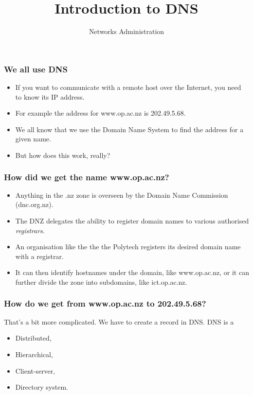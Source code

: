 \documentclass[10pt]{beamer}
\title{Introduction to DNS}
\author[IN715]{Networks Administration}
\institute[Otago Polytechnic]{
  Otago Polytechnic \\
  Dunedin, New Zealand \\
}
\date{}
\begin{document}
\begin{frame}[plain]
  \titlepage
\end{frame}


\begin{frame}
  \frametitle{We all use DNS}

 \begin{itemize}
  \item If you want to communicate with a remote host over the Internet, 
        you need to know its IP address.
  \item For example the address for www.op.ac.nz is 202.49.5.68.
  \item We all know that we use the Domain Name System to find the 
        address for a given name.
  \item But how does this work, really? 
 \end{itemize}

\end{frame}


\begin{frame}
  \frametitle{How did we get the name www.op.ac.nz?}

 \begin{itemize}
  \item Anything in the .nz zone is overseen by the Domain Name Commission (dnc.org.nz).
  \item The DNZ delegates the ability to register domain names to various authorised \emph{registrars}.
  \item An organisation like the the the Polytech registers its desired domain name with a registrar.
  \item It can then identify hostnames under the domain, like www.op.ac.nz, or it can further divide the zone into subdomains, like ict.op.ac.nz.
 \end{itemize}

\end{frame}

\begin{frame}
  \frametitle{How do we get from www.op.ac.nz to 202.49.5.68?}

 That's a bit more complicated.  We have to create a record in DNS.  DNS is a
 \begin{itemize}
  \item Distributed,
  \item Hierarchical,
  \item Client-server,
  \item Directory system.
 \end{itemize}

\end{frame}
\end{document}

